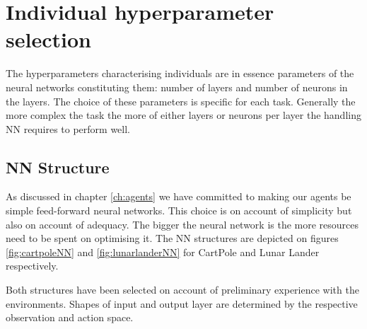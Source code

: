 \section{Individual hyperparameter selection}
The hyperparameters characterising individuals are in essence parameters of the neural networks constituting them: number of layers and number of neurons in the layers. The choice of these parameters is specific for each task. Generally the more complex the task the more of either layers or neurons per layer the handling NN requires to perform well. 

\subsection{NN Structure}
As discussed in chapter \ref{ch:agents} we have committed to making our agents be simple feed-forward neural networks. This choice is on account of simplicity but also on account of adequacy. The bigger the neural network is the more resources need to be spent on optimising it. The NN structures are depicted on figures \ref{fig:cartpoleNN} and \ref{fig:lunarlanderNN} for CartPole and Lunar Lander respectively. 

Both structures have been selected on account of preliminary experience with the environments. Shapes of input and output layer are determined by the respective observation and action space. 

